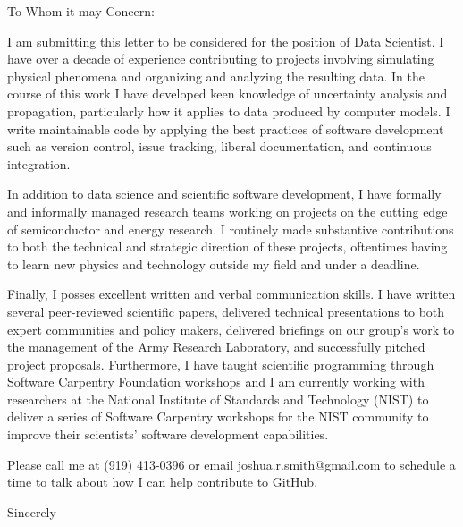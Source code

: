 \documentclass[letterpaper,10pt]{letter}
\begin{document}

\begin{letter}{}

\address{2515 13th St NW\\
         Apt. 510\\
         Washington, DC 20009}

\opening{To Whom it may Concern:}

I am submitting this letter to be considered for the position of Data Scientist.
I have over a decade of experience contributing to projects involving simulating physical phenomena and organizing and analyzing the resulting data.
In the course of this work I have developed keen knowledge of uncertainty analysis and propagation, particularly how it applies to data produced by computer models.
I write maintainable code by applying the best practices of software development such as version control, issue tracking, liberal documentation, and continuous integration.


In addition to data science and scientific software development, I have formally and informally managed research teams working on projects on the cutting edge of semiconductor and energy research.
I routinely made substantive contributions to both the technical and strategic direction of these projects, oftentimes having to learn new physics and technology outside my field and under a deadline.


Finally, I posses excellent written and verbal communication skills.
I have written several peer-reviewed scientific papers, delivered technical presentations to both expert communities and policy makers, delivered briefings on our group's work to the management of the Army Research Laboratory, and successfully pitched project proposals.
Furthermore, I have taught scientific programming through Software Carpentry Foundation workshops and I am currently working with researchers at the National Institute of Standards and Technology (NIST) to deliver a series of Software Carpentry workshops for the NIST community to improve their scientists' software development capabilities.


Please call me at (919) 413-0396 or email joshua.r.smith@gmail.com to schedule a time to talk about how I can help contribute to GitHub.


\signature{Joshua Ryan Smith}

\closing{Sincerely}


\end{letter}
\end{document}
